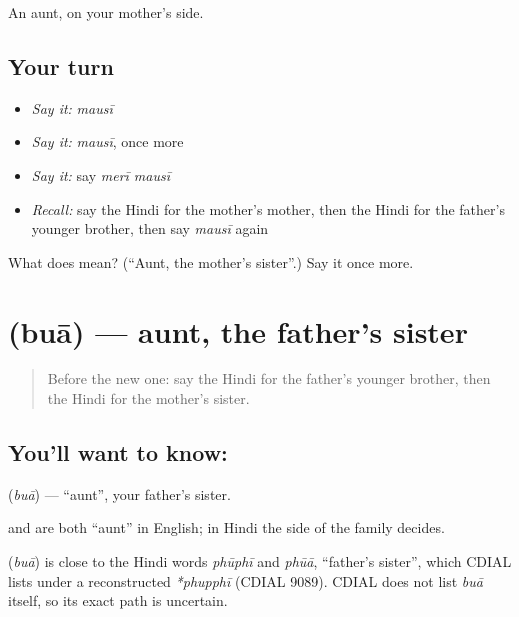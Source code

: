 \begin{grammarlens}[title={What you've built}]
An aunt, on your mother's side.
\end{grammarlens}

\subsection*{Your turn}
\begin{itemize}
\raggedright
  \item \emph{Say it:} \emph{mausī}
  \item \emph{Say it:} \emph{mausī}, once more
  \item \emph{Say it:} say \emph{merī mausī}
  \item \emph{Recall:} say the Hindi for the mother's mother, then the Hindi for the father's younger brother, then say \emph{mausī} again
\end{itemize}

\begin{tcolorbox}[breakable,colback=teal!4,colframe=teal!35!black,title={Before you move on}]
What does  mean? (\textquotedblleft{}Aunt, the mother's sister\textquotedblright{}.) Say it once more.
\end{tcolorbox}
\section[\texorpdfstring{\hi{बुआ} (buā)}{बुआ (buā)}]{ (buā) — aunt, the father's sister}

\label{lesson:HI-C117-bua}



\begin{quote}
Before the new one: say the Hindi for the father's younger brother, then the Hindi for the mother's sister.
\end{quote}

\subsection*{You'll want to know: }
\textbf{} (\emph{buā}) — \textquotedblleft{}aunt\textquotedblright{}, your father's sister.

\textbf{} and \textbf{} are both \textquotedblleft{}aunt\textquotedblright{} in English; in Hindi the side of the family decides.

\begin{cousinweb}
\textbf{} (\emph{buā}) is close to the Hindi words \emph{phūphī} and \emph{phūā}, \textquotedblleft{}father's sister\textquotedblright{}, which CDIAL lists under a reconstructed \emph{*phupphī} (CDIAL 9089). CDIAL does not list \emph{buā} itself, so its exact path is uncertain.
\end{cousinweb}


